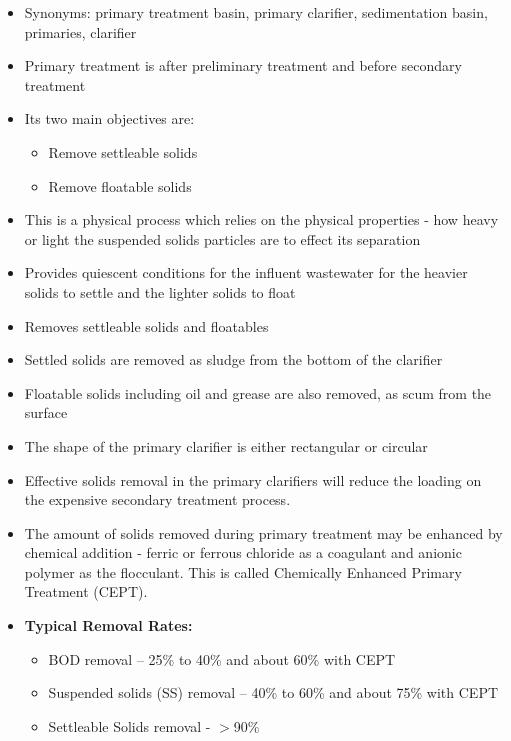 \begin{itemize}
\item Synonyms:  primary treatment basin, primary clarifier, sedimentation basin, primaries, clarifier

	
		\item Primary treatment is after preliminary treatment and 				before secondary treatment
		\item Its two main objectives are: 
			\begin{itemize}
				\item Remove settleable solids
				\item Remove floatable solids
			\end{itemize}
		\item This is a physical process which relies on the physical 			properties - how heavy or light the suspended solids particles 		are to effect its separation
		\item Provides quiescent conditions for the influent 					wastewater for the heavier solids to settle and the lighter 			solids to float
		\item Removes settleable solids and floatables
		\item Settled solids are removed as sludge from the bottom of 			the clarifier
		\item Floatable solids including oil and grease are also 				removed, as scum from the surface\\
		\item The shape of the primary clarifier is either rectangular 		or circular
	
		\item Effective solids removal in the primary clarifiers will 			reduce the loading on the expensive secondary treatment 				process.
		\item The amount of solids removed during primary treatment 			may be enhanced by chemical addition - ferric or ferrous 				chloride as a coagulant and anionic polymer as the flocculant.  		This is called Chemically Enhanced Primary Treatment (CEPT).
\item \textbf{Typical Removal Rates:}\\
\begin{itemize}
\item \hspace{10mm} BOD removal – 25\% to 40\% and about 60\% with CEPT
\item \hspace{10mm} Suspended solids (SS) removal – 40\% to 60\% and about 75\% with CEPT
\item \hspace{10mm} Settleable Solids removal - $>$90\%
\end{itemize}
\end{itemize}

